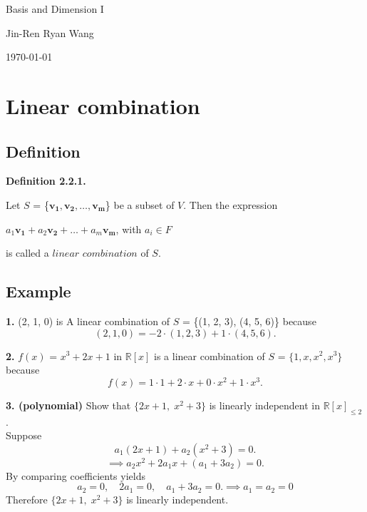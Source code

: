 \documentclass[12pt]{article}
\begin{document}
\begin{titlepage}
    \centering

    \vspace*{\fill}

    {\Huge Basis and Dimension I}

    \vspace{1cm}

    {\Large Jin-Ren Ryan Wang\par}

    \vspace{0.5cm}

    {\large \today\par}

    \vspace*{\fill}
\end{titlepage}

\tableofcontents

\newpage

\section{Linear combination}

\subsection{Definition}
\textbf{Definition 2.2.1.}

Let $S$ = \{$\mathbf{v_1}, \mathbf{v_2},\ldots, \mathbf{v_m}$\} be a subset of $V$. Then the expression
\begin{center}
    $a_1\mathbf{v_1} + a_2\mathbf{v_2} + \ldots + a_m\mathbf{v_m}$, with $a_i \in F$
\end{center}


is called a $linear$ $combination$ of $S$.

\subsection{Example}

\textbf{1.}
(2, 1, 0) is A linear combination of $S$ = \{(1, 2, 3), (4, 5, 6)\} because
\[
    (2, 1, 0) 
    = 
    -2 \cdot (1, 2, 3) + 1 \cdot (4, 5, 6).
\]

\textbf{2.}
$f(x)$ = $x^{3} + 2x + 1$ in $\mathbb{R}[x]$ is a linear combination of $S$ = $\{1,x,x^{2},x^{3}\}$ because
\[
    f(x) = 1 \cdot 1 + 2 \cdot x + 0 \cdot x^{2} + 1 \cdot x^{3}.
\]

\textbf{3. (polynomial)} 
Show that $\{2x+1,\;x^2+3\}$ is linearly independent in $\mathbb{R}[x]_{\le 2}$.\\
Suppose
\[
    a_1(2x+1)+a_2(x^2+3)=0. 
\]
\[
    \implies a_2x^2+2a_1x+(a_1+3a_2)=0. 
\]
By comparing coefficients yields
\[
a_2=0,\quad 2a_1=0,\quad a_1+3a_2=0.\implies a_1=a_2=0
\]
Therefore
$\{2x+1,\;x^2+3\}$ is linearly independent.    
\end{document}
